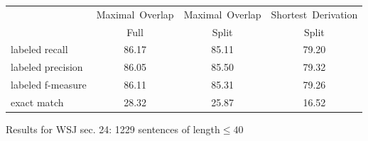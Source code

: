 %
%
%


\begin{tabular}{l | ccc}
&Maximal~Overlap&Maximal~Overlap&Shortest~Derivation\\
& Full& Split&Split\\\hline
labeled recall&		86.17&	85.11&	79.20\\
labeled precision&		86.05&	85.50&	79.32\\
labeled f-measure&		86.11&	85.31&	79.26\\
exact match&		28.32&	25.87&	16.52\\
\end{tabular}

\caption{Results for WSJ sec. 24: 1229 sentences of length$\leq 40$}

